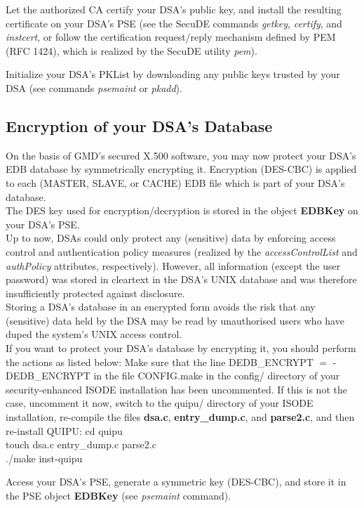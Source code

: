 \m Let the authorized CA certify your DSA's public key, and install the resulting certificate
   on your DSA's PSE (see the SecuDE commands {\em getkey}, {\em certify}, and {\em instcert}, or 
   follow the certification request/reply mechanism defined by PEM (RFC 1424), which is realized by
   the SecuDE utility {\em pem}).

\m Initialize your DSA's PKList by downloading any public keys trusted by your DSA
   (see commands {\em psemaint} or {\em pkadd}).
\ee


\subsection{Encryption of your DSA's Database}
\label{encryptedb}
On the basis of GMD's secured X.500 software, you may now protect your DSA's EDB database
by symmetrically encrypting it. Encryption (DES-CBC) is applied to each (MASTER, SLAVE, or
CACHE) EDB file which is part of your DSA's database.
\\ [1em]
The DES key used for encryption/decryption is stored in the object {\bf EDBKey} on your DSA's PSE.
\\ [1em]
Up to now, DSAs could only protect any (sensitive) data by enforcing access control
and authentication policy measures (realized by the {\em accessControlList} and {\em authPolicy} 
attributes, respectively).
However, all information (except the user password) was stored in cleartext in the DSA's 
UNIX database and was therefore insufficiently protected against disclosure.
\\ [1em]
Storing a DSA's database in an encrypted form avoids the risk that any (sensitive) data
held by the DSA may be read by unauthorised users who have duped the system's 
UNIX access control.
\\ [1em]
If you want to protect your DSA's database by encrypting it, you should perform the
actions as listed below:
\be
\m Make sure that the line
\bvtab
\1 DEDB\_ENCRYPT $=$ -DEDB\_ENCRYPT
\evtab
in the file CONFIG.make in the config/ directory of your security-enhanced ISODE installation
has been uncommented. If this is not the case, uncomment it now, switch to the quipu/ directory 
of your ISODE installation, re-compile the files
{\bf dsa.c}, {\bf entry\_dump.c}, and {\bf parse2.c}, and then re-install QUIPU:
\bvtab
\1 cd quipu \\
\1 touch dsa.c entry\_dump.c parse2.c \\
\1 ./make inst-quipu
\evtab

\m Access your DSA's PSE, generate a symmetric key (DES-CBC), and store it in the
PSE object {\bf EDBKey} (see {\em psemaint} command).

